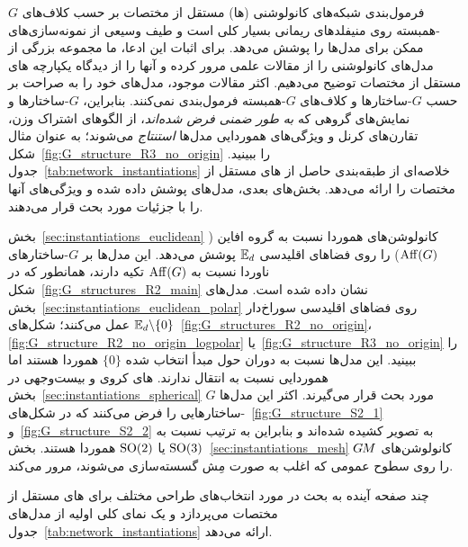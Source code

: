 
\label{part:literature_review}

فرمول‌بندی شبکه‌های کانولوشنی (\CNN ها) مستقل از مختصات بر حسب کلاف‌های $G$-همبسته روی منیفلدهای ریمانی بسیار کلی است و طیف وسیعی از نمونه‌سازی‌های ممکن برای مدل‌ها را پوشش می‌دهد.
برای اثبات این ادعا، ما مجموعه بزرگی از مدل‌های کانولوشنی را از مقالات علمی مرور کرده و آنها را از دیدگاه یکپارچه \CNN های مستقل از مختصات توضیح می‌دهیم.
اکثر مقالات موجود، مدل‌های خود را به صراحت بر حسب $G$-ساختارها و کلاف‌های $G$-همبسته فرمول‌بندی نمی‌کنند.
بنابراین، $G$-ساختارها و نمایش‌های گروهی که \emph{به طور ضمنی فرض شده‌اند}، از الگوهای اشتراک وزن، تقارن‌های کرنل و ویژگی‌های هموردایی مدل‌ها \emph{استنتاج} می‌شوند؛ به عنوان مثال شکل~\ref{fig:G_structure_R3_no_origin} را ببینید.
جدول~\ref{tab:network_instantiations} خلاصه‌ای از طبقه‌بندی حاصل از \CNN های مستقل از مختصات را ارائه می‌دهد.
بخش‌های بعدی، مدل‌های پوشش داده شده و ویژگی‌های آنها را با جزئیات مورد بحث قرار می‌دهند.

\etocsettocstyle{}{} %
\localtableofcontents

بخش~\ref{sec:instantiations_euclidean} کانولوشن‌های هموردا نسبت به گروه افاین ($\operatorname{Aff}(G)$) را روی فضاهای اقلیدسی $\mathbb{E}_d$ پوشش می‌دهد.
این مدل‌ها بر $G$-ساختارهای ناوردا نسبت به $\operatorname{Aff}(G)$ تکیه دارند، همانطور که در شکل~\ref{fig:G_structures_R2_main} نشان داده شده است.
مدل‌های بخش~\ref{sec:instantiations_euclidean_polar} روی فضاهای اقلیدسی سوراخ‌دار $\mathbb{E}_d\backslash\{0\}$ عمل می‌کنند؛ شکل‌های~\ref{fig:G_structures_R2_no_origin}، \ref{fig:G_structure_R2_no_origin_logpolar} یا~\ref{fig:G_structure_R3_no_origin} را ببینید.
این مدل‌ها نسبت به دوران حول مبدأ انتخاب شده $\{0\}$ هموردا هستند اما هموردایی نسبت به انتقال ندارند.
\CNN های کروی و بیست‌وجهی در بخش~\ref{sec:instantiations_spherical} مورد بحث قرار می‌گیرند.
اکثر این مدل‌ها $G$-ساختارهایی را فرض می‌کنند که در شکل‌های~\ref{fig:G_structure_S2_1} و~\ref{fig:G_structure_S2_2} به تصویر کشیده شده‌اند و بنابراین به ترتیب نسبت به $\operatorname{SO}(3)$ یا $\operatorname{SO}(2)$ هموردا هستند.
بخش~\ref{sec:instantiations_mesh} کانولوشن‌های $G\mkern-1.4muM$ را روی سطوح عمومی که اغلب به صورت مِش گسسته‌سازی می‌شوند، مرور می‌کند.

چند صفحه آینده به بحث در مورد انتخاب‌های طراحی مختلف برای \CNN های مستقل از مختصات می‌پردازد و یک نمای کلی اولیه از مدل‌های جدول~\ref{tab:network_instantiations} ارائه می‌دهد.

